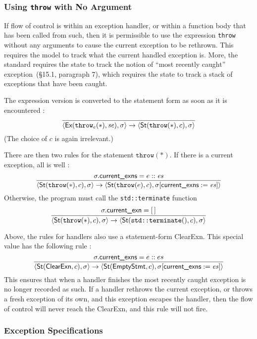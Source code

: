 \documentclass[11pt]{article}
\begin{document}
\subsubsection{Using \texttt{throw} with No Argument}
\label{sec:throw-none}

If flow of control is within an exception handler, or within a
function body that has been called from such, then it is permissible
to use the expression \texttt{throw} without any arguments to cause
the current exception to be rethrown.  This requires the model to
track what the current handled exception is.  More, the
standard requires the state to track the notion of ``most recently
caught'' exception~(\S15.1, paragraph 7), which requires the state to
track a stack of exceptions that have been caught.

The expression version \ethrow{} is converted to the statement form as
soon as it is encountered :
\[
\infer{\statebrack{\textsf{Ex}(\ethrow(*),\mathit{se}), \sigma}
  \to
  \statebrack{\textsf{St}(\texttt{throw}(*),c), \sigma}
}{}
\] (The choice of $c$ is again irrelevant.)

There are then two rules for the statement $\texttt{throw}(*)$.  If
there is a current exception, all is well
:
\[
\infer{
  \statebrack{\textsf{St}(\texttt{throw}(*), c), \sigma}
  \to
  \statebrack{\textsf{St}(\texttt{throw}(e), c),
    \sigma[\textsf{current\_exns} := \mathit{es}]}
}{
  \sigma.\textsf{current\_exns} = e :: \mathit{es}
}
\]
Otherwise, the program must call the \texttt{std::terminate} function
\[
\infer{
  \statebrack{\textsf{St}(\texttt{throw}(*), c), \sigma}
  \to
  \statebrack{\textsf{St}(\texttt{std::terminate}(), c),\sigma}
}{
  \sigma.\textsf{current\_exn} = [\,]
}
\]

Above, the rules for handlers also use a statement-form
\textsf{ClearExn}.  This special value has the following rule
:
\[
\infer{
\statebrack{\textsf{St}(\textsf{ClearExn},c), \sigma}
\to
\statebrack{\textsf{St}(\textsf{EmptyStmt},c),
  \sigma[\textsf{current\_exns}:=\mathit{es}]}
}{
  \sigma.\textsf{current\_exns} = e::es
}
\]
This ensures that when a handler finishes the most recently caught
exception is no longer recorded as such.  If a handler rethrows the
current exception, or throws a fresh exception of its own, and this
exception escapes the handler, then the flow of control will never
reach the \textsf{ClearExn}, and this rule will not fire.

\subsubsection{Exception Specifications}
\end{document}

